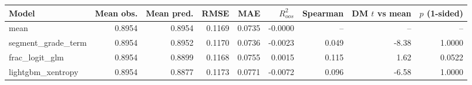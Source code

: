 \begin{tabular}{lrrrrrrrr}
\toprule
Model & Mean obs. & Mean pred. & RMSE & MAE & $R^2_{oos}$ & Spearman & DM $t$ vs mean & $p$ (1-sided) \\
\midrule
mean & 0.8954 & 0.8954 & 0.1169 & 0.0735 & -0.0000 & -- & -- & -- \\
segment\_grade\_term & 0.8954 & 0.8952 & 0.1170 & 0.0736 & -0.0023 & 0.049 & -8.38 & 1.0000 \\
frac\_logit\_glm & 0.8954 & 0.8899 & 0.1168 & 0.0755 & 0.0015 & 0.115 & 1.62 & 0.0522 \\
lightgbm\_xentropy & 0.8954 & 0.8877 & 0.1173 & 0.0771 & -0.0072 & 0.096 & -6.58 & 1.0000 \\
\bottomrule
\end{tabular}
